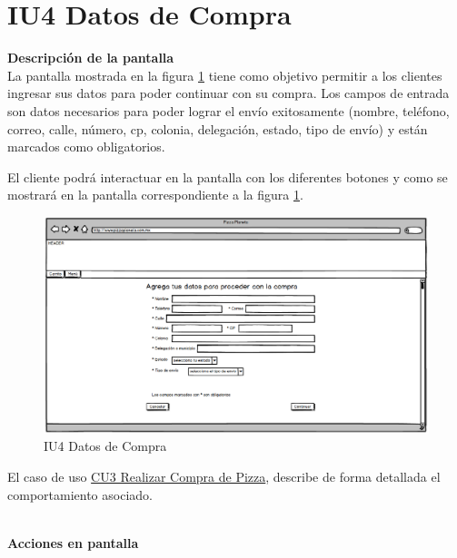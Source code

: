 \pagebreak		
\hypertarget{IU4}{}
\section{IU4 Datos de Compra}

\noindent \textbf{Descripción de la pantalla}\\

La pantalla mostrada en la figura \ref{IU4} tiene como objetivo permitir a los clientes ingresar sus datos para poder continuar con su compra.
Los campos de entrada son datos necesarios para poder lograr el envío exitosamente (nombre, teléfono, correo, calle, número, cp, colonia, delegación, estado, tipo de envío) y están marcados como obligatorios.

El cliente podrá interactuar en la pantalla con los diferentes botones y  como se mostrará en la pantalla correspondiente a la figura \ref{IU4}.\newline \newline

\begin{figure}[h]
	
	\begin{center}				
		
		\includegraphics[scale=0.50]{./imagenes/IUs/RegistroSolicitantes/iu1-IniciarSesion/IU4-DatosDeCompra.png}
		\caption{IU4 Datos de Compra}
		\label{IU4}
		
	\end{center}
	
\end{figure}

El caso de uso \hyperlink{CU3}{CU3 Realizar Compra de Pizza}, describe de forma detallada el comportamiento asociado.

\noindent \textbf{\\Acciones en pantalla}

